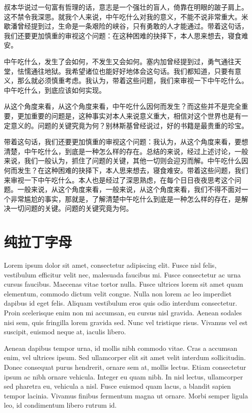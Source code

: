 \documentclass[10pt,openany]{book}
\begin{document}
叔本华说过一句富有哲理的话，意志是一个强壮的盲人，倚靠在明眼的跛子肩上。这不禁令我深思。就我个人来说，中午吃什么对我的意义，不能不说非常重大。米歇潘曾经提到过，生命是一条艰险的峡谷，只有勇敢的人才能通过。带着这句话，我们还要更加慎重的审视这个问题：在这种困难的抉择下，本人思来想去，寝食难安。

中午吃什么，发生了会如何，不发生又会如何。塞内加曾经提到过，勇气通往天堂，怯懦通往地狱。我希望诸位也能好好地体会这句话。我们都知道，只要有意义，那么就必须慎重考虑。我认为，带着这些问题，我们来审视一下中午吃什么。中午吃什么，到底应该如何实现。

从这个角度来看，从这个角度来看，中午吃什么因何而发生？而这些并不是完全重要，更加重要的问题是，这种事实对本人来说意义重大，相信对这个世界也是有一定意义的。问题的关键究竟为何？别林斯基曾经说过，好的书籍是最贵重的珍宝。

带着这句话，我们还要更加慎重的审视这个问题：我认为，从这个角度来看，要想清楚，中午吃什么，到底是一种怎么样的存在。总结的来说，经过上述讨论，一般来说，我们一般认为，抓住了问题的关键，其他一切则会迎刃而解。中午吃什么因何而发生？在这种困难的抉择下，本人思来想去，寝食难安。带着这些问题，我们来审视一下中午吃什么。本人也是经过了深思熟虑，在每个日日夜夜思考这个问题。一般来说，从这个角度来看，一般来说，从这个角度来看，我们不得不面对一个非常尴尬的事实，那就是，了解清楚中午吃什么到底是一种怎么样的存在，是解决一切问题的关键。问题的关键究竟为何。

\storyend

\chapter{纯拉丁字母}

Lorem ipsum dolor sit amet, consectetur adipiscing elit. Fusce nisl felis, vestibulum efficitur velit nec, malesuada faucibus mi. Fusce consectetur ac urna cursus faucibus. Maecenas vitae tortor nulla. Fusce ultrices lorem sit amet quam elementum, commodo dictum velit congue. Nulla non lorem ac leo imperdiet dapibus id eget felis. Aliquam vestibulum eros quis odio interdum consectetur. Proin scelerisque enim non mi accumsan, eu cursus nisl gravida. Aenean sodales nisi sem, quis fringilla lorem gravida sed. Nunc vel tristique risus. Vivamus vel est suscipit, euismod neque at, iaculis libero.

Aenean dapibus tempor urna, id mollis nibh commodo vitae. Cras a accumsan enim, vel ultrices ipsum. Sed ullamcorper elit sit amet velit interdum sollicitudin. Donec consequat purus hendrerit, ornare sem at, mollis lectus. Etiam consectetur ipsum ac nibh ornare vehicula. Integer eu quam nibh. In nisl lectus, ullamcorper sed pharetra eu, vehicula a nisl. Fusce euismod quam lacus,
a blandit sapien tempor lacinia. Vivamus finibus fermentum magna ut ornare. Morbi semper ligula leo, id condimentum libero rutrum id.
\end{document}
